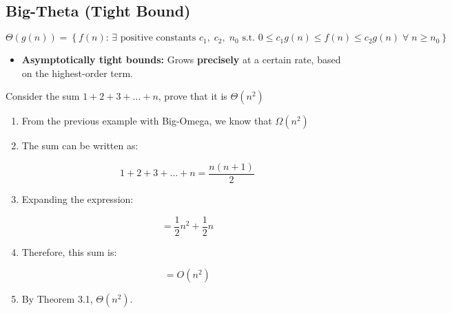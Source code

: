 \subsection{Big-Theta (Tight Bound)}
    \begin{definition}
        $ \Theta(g(n)) = \left\{ f(n) \text{: } \exists \text{ positive constants } c_1, \; c_2, \; n_0 \text{ s.t. } 0 \leq c_1 g(n) \leq f(n) \leq c_2 g(n) \; \forall \; n \geq n_0 \right\} $
        \begin{itemize}
            \item \textbf{Asymptotically tight bounds:} Grows \textbf{precisely} at a certain rate, based on the highest-order term.
        \end{itemize}
    \end{definition}

    \begin{example}
        Consider the sum \( 1 + 2 + 3 + \ldots + n \), prove that it is $\Theta(n^2)$
        \begin{enumerate}
            \item From the previous example with Big-Omega, we know that $\Omega(n^2)$
            \item The sum can be written as:

            \[
            1 + 2 + 3 + \ldots + n = \frac{n(n+1)}{2}
            \]
        
            \item Expanding the expression:
        
            \[
            = \frac{1}{2}n^2 + \frac{1}{2}n
            \]
        
            \item Therefore, this sum is:
        
            \[
            = O(n^2)
            \]
            \item By Theorem 3.1, $\Theta(n^2)$.
        \end{enumerate}
    \end{example}

